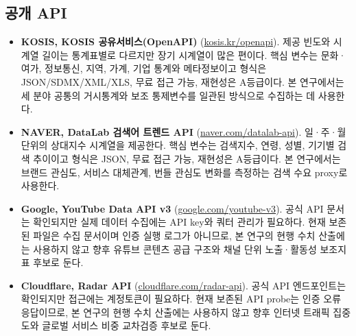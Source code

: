 \documentclass[11pt,a4paper]{report}
\begin{document}
\subsection{공개 API}
\begin{itemize}[leftmargin=*, itemsep=0.6em]
  \item \textbf{KOSIS, KOSIS 공유서비스(OpenAPI)} (\href{https://kosis.kr/openapi/introduce/introduce_01List.do}{kosis.kr/openapi}). 제공 빈도와 시계열 길이는 통계표별로 다르지만 장기 시계열이 많은 편이다. 핵심 변수는 문화·여가, 정보통신, 지역, 가계, 기업 통계와 메타정보이고 형식은 JSON/SDMX/XML/XLS, 무료 접근 가능, 재현성은 A등급이다. 본 연구에서는 세 분야 공통의 거시통계와 보조 통제변수를 일관된 방식으로 수집하는 데 사용한다.
  \item \textbf{NAVER, DataLab 검색어 트렌드 API} (\href{https://developers.naver.com/products/service-api/datalab/datalab.md}{naver.com/datalab-api}). 일·주·월 단위의 상대지수 시계열을 제공한다. 핵심 변수는 검색지수, 연령, 성별, 기기별 검색 추이이고 형식은 JSON, 무료 접근 가능, 재현성은 A등급이다. 본 연구에서는 브랜드 관심도, 서비스 대체관계, 번들 관심도 변화를 측정하는 검색 수요 proxy로 사용한다.
  \item \textbf{Google, YouTube Data API v3} (\href{https://developers.google.com/youtube/v3/getting-started}{google.com/youtube-v3}). 공식 API 문서는 확인되지만 실제 데이터 수집에는 API key와 쿼터 관리가 필요하다. 현재 보존된 파일은 수집 문서이며 인증 실행 로그가 아니므로, 본 연구의 현행 수치 산출에는 사용하지 않고 향후 유튜브 콘텐츠 공급 구조와 채널 단위 노출·활동성 보조지표 후보로 둔다.
  \item \textbf{Cloudflare, Radar API} (\href{https://developers.cloudflare.com/radar/get-started/first-request/}{cloudflare.com/radar-api}). 공식 API 엔드포인트는 확인되지만 접근에는 계정토큰이 필요하다. 현재 보존된 API probe는 인증 오류 응답이므로, 본 연구의 현행 수치 산출에는 사용하지 않고 향후 인터넷 트래픽 집중도와 글로벌 서비스 비중 교차검증 후보로 둔다.
\end{itemize}
\end{document}
